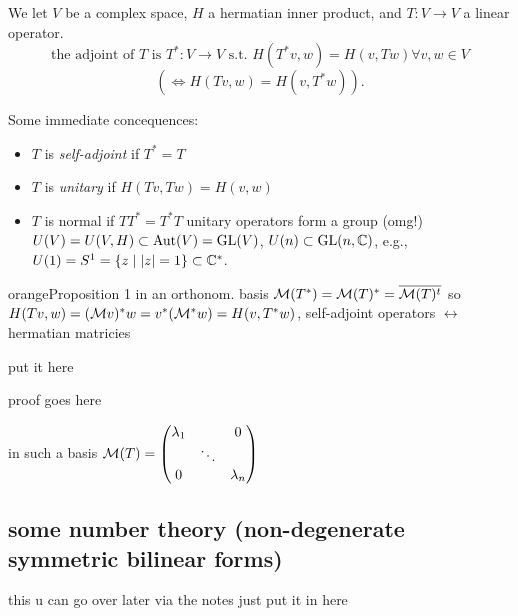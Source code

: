 \documentclass[12pt,oneside]{report}
\begin{document}
\begin{definition}
 We let \( V \) be a complex space, \( H \) a hermatian inner product, and \( T:V \to  V \) a linear operator.
  \begin{displaymath}
    \text{the adjoint of } T \text{ is } T^* : V \to  V \text{ s.t. } H(T^*v,w)=H(v,Tw) \forall v,w \in  V
  \end{displaymath}
  \[
    (\iff H(Tv,w)=H(v,T^*w))
  .\] 


\end{definition}
Some immediate concequences:
\begin{itemize}
  \item \( T \) is \textit{self-adjoint} if \( T^*=T \)
  \item \(  T \) is \textit{unitary} if \( H(Tv,Tw)=H(v,w) \)
  \item \( T \) is normal if \( TT^*=T^*T \)
    unitary operators form a group (omg!) \( U(V)=U(V,H) \subset \operatorname{Aut}(V) = \text{GL}(V) \), \( U(n) \subset  \text{GL}(n,\CC) \), e.g., \( U(1)=S^1=\{z \mid  |z| = 1\} \subset  \CC[*]  \). 
\end{itemize}





\begin{mybox}{orange}{Proposition 1}
    in an orthonom. basis \( \mathcal{M} (T^*) = \mathcal{M} (T)^*=\overline{\mathcal{M}(T)^t}  \) so \( H(Tv,w)=(\mathcal{M} v )^*w = v^* (\mathcal{M}^* w)=H(v,T^*w) \), self-adjoint operators \( \leftrightarrow \) hermatian matricies 

\end{mybox}


\begin{definition}
  put it here 
\end{definition}

proof goes here

in such a basis \( \mathcal{M} (T) = \begin{pmatrix} \lambda_1 & \, & 0 \\ \, & \ddots& \, \\ 0 & \, & \lambda_n \end{pmatrix}  \)


\subsection{some number theory (non-degenerate symmetric bilinear forms)}

this u can go over later via the notes just put it in here
\end{document}

